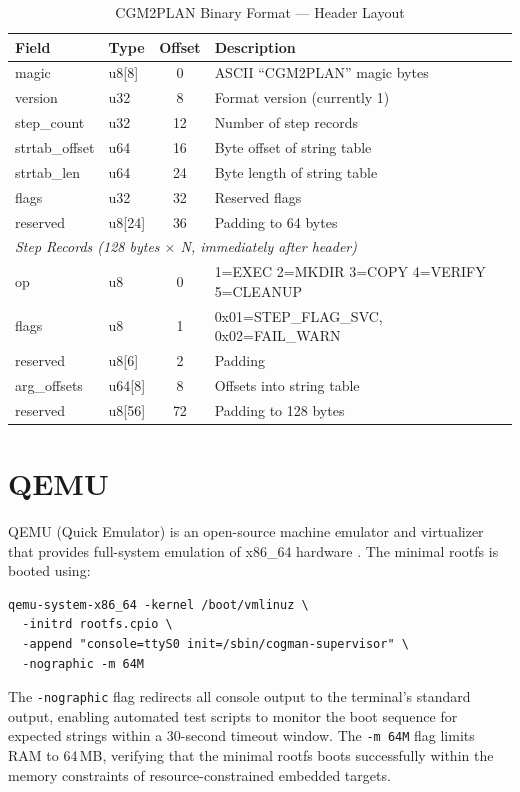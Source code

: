 \documentclass[12pt,a4paper]{report}
\begin{document}
\begin{table}[H]
\centering
\caption{CGM2PLAN Binary Format --- Header Layout}
\label{tab:cgm2plan}
\renewcommand{\arraystretch}{1.2}
\begin{tabularx}{\linewidth}{l l c X}
\toprule
\textbf{Field} & \textbf{Type} & \textbf{Offset} & \textbf{Description}\\
\midrule
magic          & u8{[}8{]}  & 0   & ASCII ``CGM2PLAN'' magic bytes\\
version        & u32        & 8   & Format version (currently 1)\\
step\_count    & u32        & 12  & Number of step records\\
strtab\_offset & u64        & 16  & Byte offset of string table\\
strtab\_len    & u64        & 24  & Byte length of string table\\
flags          & u32        & 32  & Reserved flags\\
reserved       & u8{[}24{]} & 36  & Padding to 64 bytes\\
\midrule
\multicolumn{4}{l}{\textit{Step Records (128 bytes $\times$ N, immediately after header)}}\\
op             & u8         & 0   & 1=EXEC 2=MKDIR 3=COPY 4=VERIFY 5=CLEANUP\\
flags          & u8         & 1   & 0x01=STEP\_FLAG\_SVC, 0x02=FAIL\_WARN\\
reserved       & u8{[}6{]}  & 2   & Padding\\
arg\_offsets   & u64{[}8{]} & 8   & Offsets into string table\\
reserved       & u8{[}56{]} & 72  & Padding to 128 bytes\\
\bottomrule
\end{tabularx}
\end{table}

\section{QEMU}

QEMU (Quick Emulator) is an open-source machine emulator and virtualizer that
provides full-system emulation of x86\_64 hardware \cite{qemu}. The minimal
rootfs is booted using:
\begin{lstlisting}
qemu-system-x86_64 -kernel /boot/vmlinuz \
  -initrd rootfs.cpio \
  -append "console=ttyS0 init=/sbin/cogman-supervisor" \
  -nographic -m 64M
\end{lstlisting}
The \texttt{-nographic} flag redirects all console output to the terminal's
standard output, enabling automated test scripts to monitor the boot sequence for
expected strings within a 30-second timeout window. The \texttt{-m 64M} flag
limits RAM to 64\,MB, verifying that the minimal rootfs boots successfully within
the memory constraints of resource-constrained embedded targets.
\end{document}
